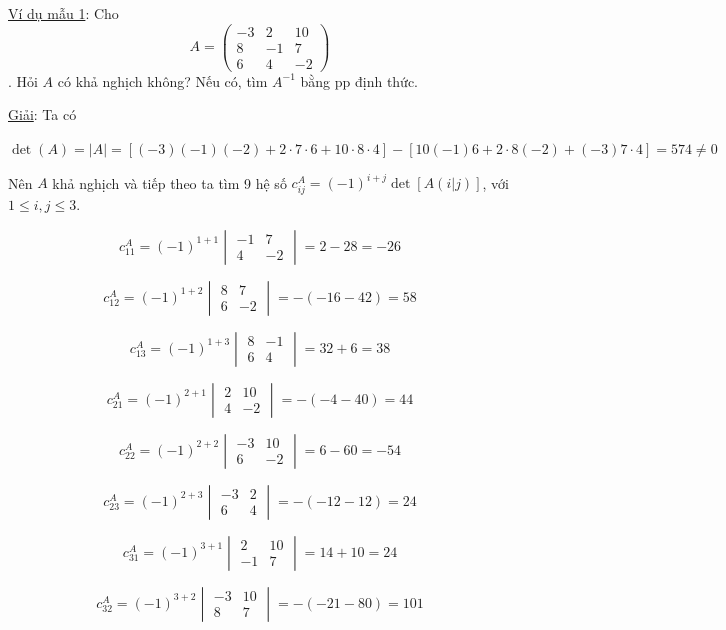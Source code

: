 \documentclass[
]{article}
\let\ul\uline
\begin{document}
\ul{Ví dụ mẫu 1}: Cho
$$A = \begin{pmatrix} -3 & 2 & 10 \\ 8 & -1 & 7 \\ 6 & 4 & -2 \end{pmatrix}$$. Hỏi
$A$ có khả nghịch
không? Nếu có, tìm
$A^{-1}$ bằng pp định
thức.

\ul{Giải}: Ta có

$\det(A) = |A| = [(-3)(-1)(-2) + 2 \cdot 7 \cdot 6 + 10 \cdot 8 \cdot 4] - [10(-1)6 + 2 \cdot 8(-2) + (-3)7 \cdot 4] = 574 \neq 0$

Nên $A$ khả nghịch
và tiếp theo ta tìm 9 hệ số
$c_{ij}^A = (-1)^{i+j} \det[A(i|j)]$, với
$1 \le i, j \le 3$.

$$c_{11}^A = (-1)^{1+1} \begin{vmatrix} -1 & 7 \\ 4 & -2 \end{vmatrix} = 2 - 28 = -26$$

$$c_{12}^A = (-1)^{1+2} \begin{vmatrix} 8 & 7 \\ 6 & -2 \end{vmatrix} = -(-16 - 42) = 58$$

$$c_{13}^A = (-1)^{1+3} \begin{vmatrix} 8 & -1 \\ 6 & 4 \end{vmatrix} = 32 + 6 = 38$$

$$c_{21}^A = (-1)^{2+1} \begin{vmatrix} 2 & 10 \\ 4 & -2 \end{vmatrix} = -(-4 - 40) = 44$$

$$c_{22}^A = (-1)^{2+2} \begin{vmatrix} -3 & 10 \\ 6 & -2 \end{vmatrix} = 6 - 60 = -54$$

$$c_{23}^A = (-1)^{2+3} \begin{vmatrix} -3 & 2 \\ 6 & 4 \end{vmatrix} = -(-12 - 12) = 24$$

$$c_{31}^A = (-1)^{3+1} \begin{vmatrix} 2 & 10 \\ -1 & 7 \end{vmatrix} = 14 + 10 = 24$$

$$c_{32}^A = (-1)^{3+2} \begin{vmatrix} -3 & 10 \\ 8 & 7 \end{vmatrix} = -(-21 - 80) = 101$$
\end{document}
